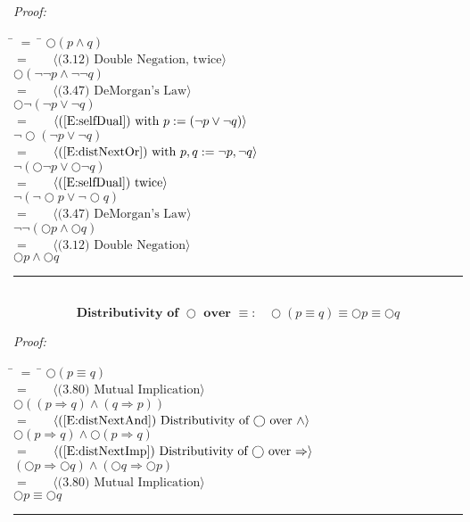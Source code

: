 \documentclass[fleqn, leqno]{article}
\newcommand{\lgap}{2pt}                             %
\newcommand{\mymathindent}{24pt}                      %
\newcommand{\Next}{\bigcirc}
\newcommand{\myqed}{\hfill\rule[-.23ex]{1.2ex}{2.0ex}}
\newcommand{\Gll} {\langle}                         %
\newcommand{\Ggg} {\rangle}                         %
\newcommand{\Hint}[1]     {\ \ \ $\Gll              \mbox{#1} \Ggg$ }   %
\begin{document}
\emph{Proof:}
\begin{tabbing}
\hspace{\mymathindent} \= $= \;$ \= \kill
  \> \>   $\Next (p \land q)$\\[\lgap]
  \> $=$  \>  \Hint{(3.12) Double Negation, twice}\\[\lgap]
  \> \>   $\Next (\lnot\lnot p \land \lnot\lnot q)$\\[\lgap]
  \> $=$  \>  \Hint{(3.47) DeMorgan's Law}\\[\lgap]
  \> \>   $\Next\lnot(\lnot p \lor \lnot q)$\\[\lgap]
  \> $=$  \>  \Hint{(\ref{E:selfDual}) with $p:= (\lnot p \lor \lnot q$)}\\[\lgap]
  \> \>   $\lnot\Next (\lnot p \lor \lnot q)$\\[\lgap]
  \> $=$  \>  \Hint{(\ref{E:distNextOr}) with $p,q := \lnot p, \lnot q$}\\[\lgap]
  \> \>   $\lnot (\Next\lnot p \lor \Next \lnot q)$\\[\lgap]
  \> $=$  \>  \Hint{(\ref{E:selfDual}) twice}\\[\lgap]
  \> \>   $\lnot(\lnot\Next p \lor \lnot\Next q)$\\[\lgap]
  \> $=$  \>  \Hint{(3.47) DeMorgan's Law}\\[\lgap]
  \> \>   $\lnot\lnot(\Next p \land \Next q)$\\[\lgap]
  \> $=$  \>  \Hint{(3.12) Double Negation}\\[\lgap]
  \> \>   $\Next p \land \Next q$\\[\lgap]
\end{tabbing}
\myqed\\[\lgap]


\begin{equation}\label{E:distNextEquiv}
\textbf{Distributivity of $\Next$ over $\equiv$:}\quad \Next (p \equiv q) \equiv \Next p \equiv \Next q
\end{equation}

\emph{Proof:}
\begin{tabbing}
\hspace{\mymathindent} \= $= \;$ \= \kill
  \> \>   $\Next (p \equiv q)$\\[\lgap]
  \> $=$  \>  \Hint{(3.80) Mutual Implication}\\[\lgap]
  \> \>   $\Next ((p \Rightarrow q) \land (q \Rightarrow p))$\\[\lgap]
  \> $=$  \>  \Hint{(\ref{E:distNextAnd}) Distributivity of $\Next$ over $\land$}\\[\lgap]
  \> \>   $\Next (p \Rightarrow q) \land \Next (p \Rightarrow q)$\\[\lgap]
  \> $=$  \>  \Hint{(\ref{E:distNextImp}) Distributivity of $\Next$ over $\Rightarrow$}\\[\lgap]
  \> \>   $(\Next p \Rightarrow \Next q) \land (\Next q \Rightarrow \Next p)$\\[\lgap]
  \> $=$  \>  \Hint{(3.80) Mutual Implication}\\[\lgap]
  \> \>   $\Next p \equiv \Next q$
\end{tabbing}
\myqed\\[\lgap]
\end{document}
